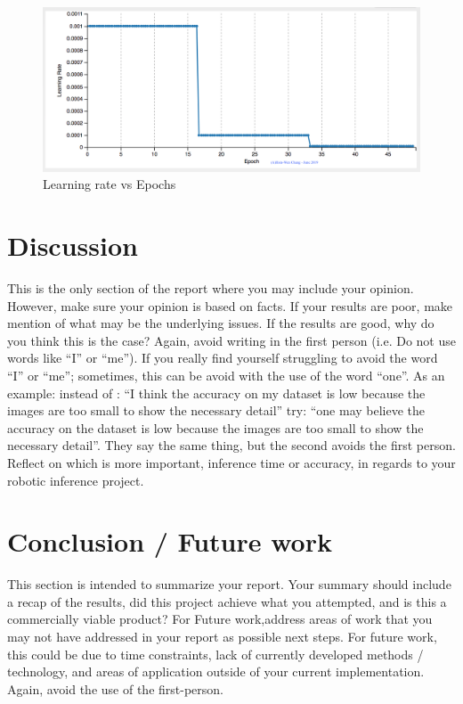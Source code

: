 \documentclass[10pt,journal,compsoc]{IEEEtran}
\begin{document}
\begin{figure}[thpb]
      \centering
      \includegraphics[width=\linewidth]{Learning_rate.png}
      \caption{Learning rate vs Epochs}
      \label{fig:robot1}
\end{figure}
\section{Discussion}
This is the only section of the report where you may include your opinion. However, make sure your opinion is based on facts. If your results are poor, make mention of what may be the underlying issues. If the results are good, why do you think this is the case? Again, avoid writing in the first person (i.e. Do not use words like “I” or “me”). If you really find yourself struggling to avoid the word “I” or “me”; sometimes, this can be avoid with the use of the word “one”. As an example: instead of : “I think the accuracy on my dataset is low because the images are too small to show the necessary detail” try: “one may believe the accuracy on the dataset is low because the images are too small to show the necessary detail”. They say the same thing, but the second avoids the first person. 
Reflect on which is more important, inference time or accuracy, in regards to your robotic inference project.

\section{Conclusion / Future work}
This section is intended to summarize your report. Your summary should include a recap of the results, did this project achieve what you attempted, and is this a commercially viable product? 
For Future work,address areas of work that you may not have addressed in your report as possible next steps. For future work, this could be due to time constraints, lack of currently developed methods / technology, and areas of application outside of your current implementation. Again, avoid the use of the first-person.



\end{document}
